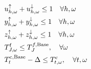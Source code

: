 {\begin{subequations}
\begin{align}
        \quad                                                                                             & \quad u_{h,\omega}^{\uparrow} + u_{h,\omega}^{\downarrow} \leq 1 \quad                                                           \forall{h,\omega}                                                                                                                                                                     \label{aux:5}                                              \\
        \quad                                                                                             & \quad y_{h,\omega}^{\uparrow} + y_{h,\omega}^{\downarrow} \leq 1 \quad                                                           \forall{h,\omega}                                                                                                                                                                     \label{aux:6}                                              \\
        \quad                                                                                             & \quad z_{h,\omega}^{\uparrow} + z_{h,\omega}^{\downarrow} \leq 1 \quad                                                           \forall{h,\omega} \label{aux:7}                                                                                                                                                                                                                  \\
        \quad                                                                                             & \quad T^{\rm{f}}_{J,\omega} \leq T^{f, \text{Base}}_{J}, \quad \forall{\omega} \label{temp:1}                                                                                                                                                                                                                                                                                     \\
        \quad                                                                                             & \quad T^{\rm{c},\text{Base}}_{t} - \Delta \leq T^{\rm{c}}_{t, \omega}, \quad                                                                                                                                                                                                                                                                    \forall{t, \omega} \label{temp:2} \\

\end{align}
\end{subequations}}

